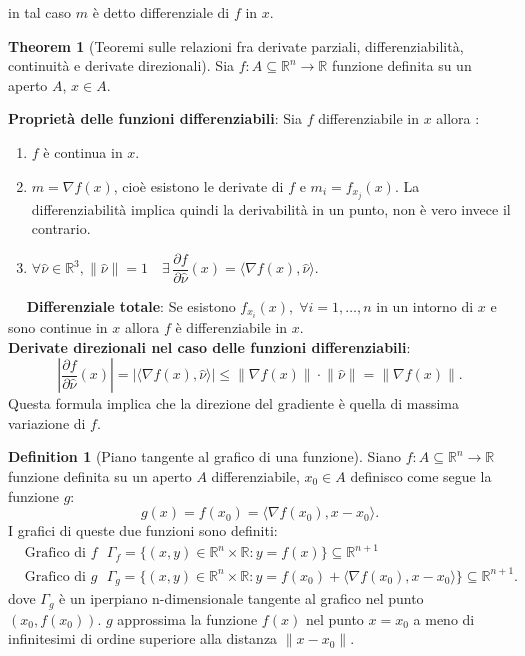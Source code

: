 \documentclass[leqno]{article}
\theoremstyle{definition}
\newtheorem{definition}{Definition}[section]
\numberwithin{equation}{section}
\newtheorem{theorem}{Theorem}[section]
\theoremstyle{remark}
\begin{document}
	in tal caso $m$ è detto differenziale di $f$ in $x$.
	
	\begin{theorem}[Teoremi sulle relazioni fra derivate parziali, differenziabilità, continuità e derivate direzionali]
		Sia $f:A\subseteq \mathbb{R}^n \rightarrow \mathbb{R}$ funzione definita su un aperto $A$, $ {x} \in A$.
		\newline
		
		\textbf{Proprietà delle funzioni differenziabili}:
		Sia $f$ differenziabile in $x$ allora :
		\begin{enumerate}
			\item $f$ è continua in $x$.
			\item $m=\nabla f (x)$, cioè esistono le derivate di $f$ e $m_i=f_{x_j}(x).$ La differenziabilità implica quindi la derivabilità in un punto, non è vero invece il contrario.
			\item $\forall \hat{\nu} \in \mathbb{R}^3, \lVert \hat{\nu} \rVert =1 \quad \exists \, \dfrac{\partial f }{\partial \hat{\nu}}(x)= \langle \nabla f(x), \hat{\nu} \rangle$.
		\end{enumerate} 
		$\quad$ \textbf{Differenziale totale}: Se esistono $f_{x_i}(x), \; \forall i = 1, \dots ,n$ in un intorno di $x$ e sono continue in $x$ allora $f$ è differenziabile in $x$.
		\\
		\textbf{Derivate direzionali nel caso delle funzioni differenziabili}: 
		\begin{equation}
			\left| \dfrac{\partial f}{\partial \hat{\nu}}(x) \right|=\left| \langle \nabla f(x), \hat{\nu}\rangle \right| \le \lVert \nabla f(x)\rVert \cdot \lVert \hat{\nu} \rVert = \lVert \nabla f(x) \rVert.
		\end{equation}
		Questa formula implica che la direzione del gradiente è quella di massima variazione di $f$.
	\end{theorem}
	
	\begin{definition}[Piano tangente al grafico di una funzione]
		Siano $f:A\subseteq \mathbb{R}^n \rightarrow \mathbb{R}$ funzione definita su un aperto $A$ differenziabile, $ {x_0} \in A$ definisco come segue la funzione $g$:
		\begin{equation}
			g(x) = f(x_0)=\langle \nabla f (x_0) , x-x_0\rangle .
		\end{equation}
		I grafici di queste due funzioni sono definiti:
		\begin{equation}
			\begin{aligned}
				&\text{Grafico di $f$ } \Gamma_f =\{ (x,y)\in \mathbb{R}^n \times \mathbb{R} : y = f(x) \} \subseteq \mathbb{R}^{n+1} \\
				&\text {Grafico di $g$ } \Gamma_g = \{ (x,y)\in \mathbb{R}^n \times \mathbb{R} : y = f(x_0) + \langle \nabla f(x_0) , x - x_0 \rangle \} \subseteq \mathbb{R}^{n+1}.
			\end{aligned}
		\end{equation}
		dove $\Gamma_g$ è un iperpiano n-dimensionale tangente al grafico nel punto $(x_0,f(x_0))$. $g$ approssima la funzione $f(x)$ nel punto $x=x_0$ a meno di infinitesimi di ordine superiore alla distanza $\lVert x-x_0 \rVert$.
	\end{definition}
	
\end{document}
